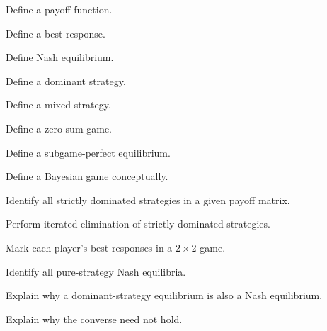 \begin{exercise}[1]
Define a payoff function.
\end{exercise}

\begin{exercise}[1]
Define a best response.
\end{exercise}

\begin{exercise}[1]
Define Nash equilibrium.
\end{exercise}

\begin{exercise}[1]
Define a dominant strategy.
\end{exercise}

\begin{exercise}[1]
Define a mixed strategy.
\end{exercise}

\begin{exercise}[1]
Define a zero-sum game.
\end{exercise}

\begin{exercise}[1]
Define a subgame-perfect equilibrium.
\end{exercise}

\begin{exercise}[1]
Define a Bayesian game conceptually.
\end{exercise}

\begin{exercise}[2]
Identify all strictly dominated strategies in a given payoff matrix.
\end{exercise}

\begin{exercise}[2]
Perform iterated elimination of strictly dominated strategies.
\end{exercise}

\begin{exercise}[2]
Mark each player's best responses in a \(2\times2\) game.
\end{exercise}

\begin{exercise}[2]
Identify all pure-strategy Nash equilibria.
\end{exercise}

\begin{exercise}[2]
Explain why a dominant-strategy equilibrium is also a Nash equilibrium.
\end{exercise}

\begin{exercise}[2]
Explain why the converse need not hold.
\end{exercise}

